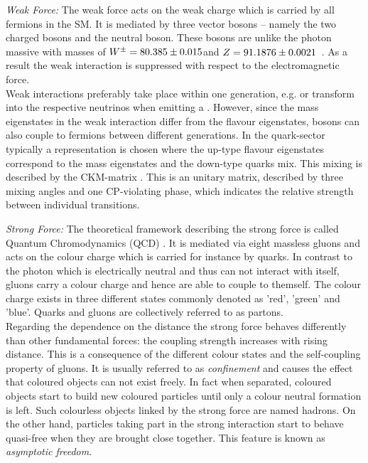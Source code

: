 \begin{description}
\begin{description}
  \item \textit{Weak Force:} The weak force acts on the weak charge which is carried by all fermions in the SM. It is mediated by three vector bosons -- namely the two charged \Wpm bosons and the neutral \Z boson. These bosons are unlike the photon massive with masses of $W^{\pm} = 80.385 \pm 0.015$\gev and $Z = 91.1876 \pm 0.0021$\gev~\cite{bib:PDG:2012}. As a result the weak interaction is suppressed with respect to the electromagnetic force. \\
Weak interactions preferably take place within one generation, e.g. \lel or \lmu transform into the respective neutrinos when emitting a \Wm. However, since the mass eigenstates in the weak interaction differ from the flavour eigenstates, \Wpm bosons can also couple to fermions between different generations. In the quark-sector typically a representation is chosen where the up-type flavour eigenstates correspond to the mass eigenstates and the down-type quarks mix. This mixing is described by the CKM-matrix . This is an unitary matrix, described by three mixing angles and one CP-violating phase, which indicates the relative strength between individual transitions. 
  \item \textit{Strong Force:} The theoretical framework describing the strong force is called Quantum Chromodynamics (QCD) . It is mediated via eight massless gluons and acts on the colour charge which is carried for instance by quarks. In contrast to the photon which is electrically neutral and thus can not interact with itself, gluons carry a colour charge and hence are able to couple to themself. The colour charge exists in three different states commonly denoted as 'red', 'green' and 'blue'. Quarks and gluons are collectively referred to as partons. \\
Regarding the dependence on the distance the strong force behaves differently than other fundamental forces: the coupling strength increases with rising distance. This is a consequence of the different colour states and the self-coupling property of gluons. It is usually referred to as \textit{confinement} and causes the effect that coloured objects can not exist freely. In fact when separated, coloured objects start to build new coloured particles until only a colour neutral formation is left. Such colourless objects linked by the strong force are named hadrons. On the other hand, particles taking part in the strong interaction start to behave quasi-free when they are brought close together. This feature is known as \textit{asymptotic freedom}.   

\end{description}
\end{description}
